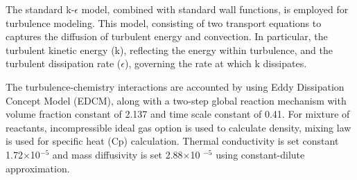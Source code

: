 The standard k-$\epsilon$ model, combined with standard wall functions, is employed for turbulence modeling. This model, consisting of two transport equations to captures the diffusion of turbulent energy and convection. In particular, the turbulent kinetic energy (k), reflecting the energy within turbulence, and the turbulent dissipation rate ($\epsilon$), governing the rate at which k dissipates.


 
The turbulence-chemistry interactions are accounted by using Eddy Dissipation Concept Model (EDCM), along with a two-step global reaction mechanism with volume fraction constant of 2.137 and time scale constant of 0.41. For mixture of reactants, incompressible ideal gas option is used to calculate density, mixing law is used for specific heat (Cp) calculation. Thermal conductivity is set constant 1.72$\times$10$^{-5}$ and mass diffusivity is set 2.88$\times$10 $^{-5}$ using constant-dilute approximation.


